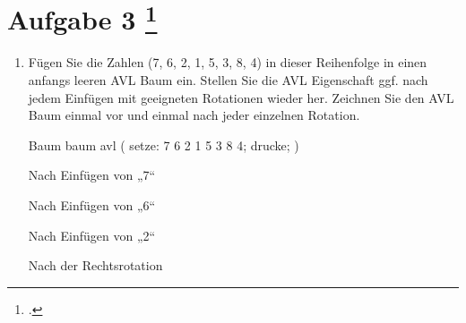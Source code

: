 \documentclass{lehramt-informatik-aufgabe}
\begin{document}
\section{Aufgabe 3
\footcite{examen:66115:2014:03}}

\begin{enumerate}


\item Fügen Sie die Zahlen (7, 6, 2, 1, 5, 3, 8, 4) in dieser
Reihenfolge in einen anfangs leeren AVL Baum ein. Stellen Sie die AVL
Eigenschaft ggf. nach jedem Einfügen mit geeigneten Rotationen wieder
her. Zeichnen Sie den AVL Baum einmal vor und einmal nach jeder
einzelnen Rotation.

\begin{liProjektSprache}{Baum}
baum avl (
  setze: 7 6 2 1 5 3 8 4;
  drucke;
)
\end{liProjektSprache}

\begin{liDiagramm}{Nach Einfügen von „7“}
\end{liDiagramm}

\begin{liDiagramm}{Nach Einfügen von „6“}
\end{liDiagramm}

\begin{liDiagramm}{Nach Einfügen von „2“}
\end{liDiagramm}

\begin{liDiagramm}{Nach der Rechtsrotation}
\end{liDiagramm}


\end{enumerate}
\end{document}

